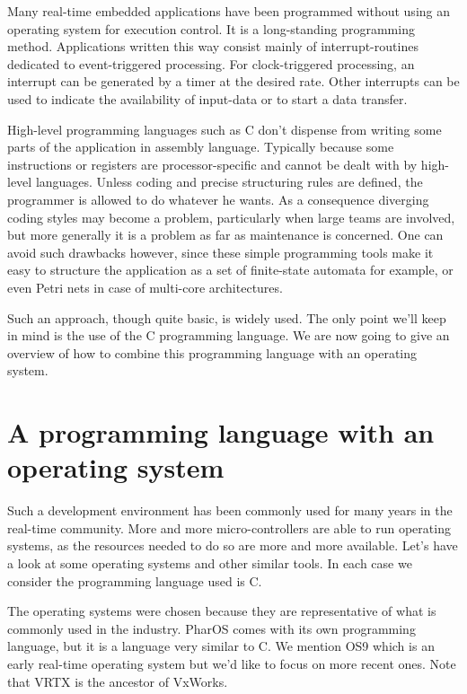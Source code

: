 \documentclass[10pt]{report}
\begin{document}
Many real-time embedded applications have been programmed without
using an operating system for execution control. It is a long-standing 
programming method. Applications written this way consist mainly of 
interrupt-routines dedicated to event-triggered processing. 
For clock-triggered processing, an interrupt can be generated by a timer 
at the desired rate. Other interrupts can be used to indicate the availability 
of input-data or to start a data transfer.

High-level programming languages such as C don't dispense from
writing some parts of the application in assembly language.
Typically because some instructions or registers are
processor-specific and cannot be dealt with by high-level
languages. Unless coding and precise structuring rules are
defined, the programmer is allowed to do whatever he wants. As a
consequence diverging coding styles may become a problem,
particularly when large teams are involved, but more generally it is a 
problem as far as maintenance is concerned. One can avoid such drawbacks
however, since these simple programming tools make it easy to
structure the application as a set of finite-state automata for
example, or even Petri nets in case of multi-core architectures.

Such an approach, though quite basic, is widely used. The only
point we'll keep in mind is the use of the C programming
language. We are now going to give an overview of how to combine
this programming language with an operating system.


\section{A programming language with an operating system}

Such a development environment has been commonly used for many
years in the real-time community. More and more micro-controllers
are able to run operating systems, as the resources needed to do
so are more and more available. Let's have a look at some
operating systems and other similar tools. In each case we
consider the programming language used is C.

The operating systems were chosen because they are representative of what is
commonly used in the industry. PharOS comes with its own
programming language, but it is a language very similar to C. We
mention OS9 which is an early real-time operating system but we'd
like to focus on more recent ones. Note that VRTX is the ancestor
of VxWorks.
\end{document}
